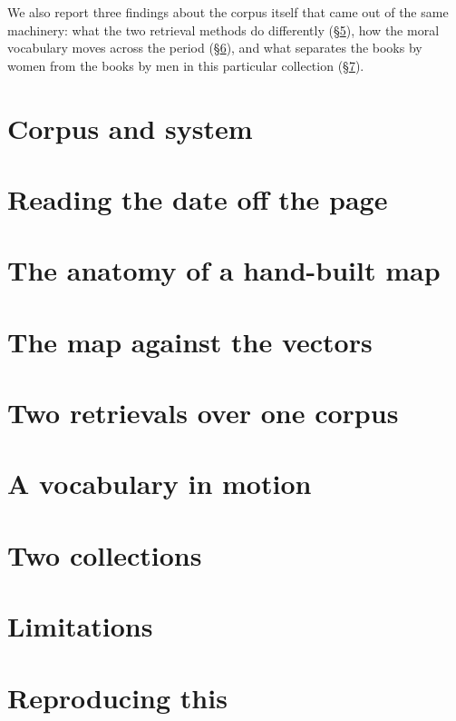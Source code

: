 \documentclass[11pt,a4paper]{article}
\begin{document}
We also report three findings about the corpus itself that came out of the
same machinery: what the two retrieval methods do differently
(\S\ref{sec:retrieval}), how the moral vocabulary moves across the period
(\S\ref{sec:diachrony}), and what separates the books by women from the books
by men in this particular collection (\S\ref{sec:authorship}).

\section{Corpus and system}
\label{sec:corpus}



\section{Reading the date off the page}
\label{sec:dates}



\section{The anatomy of a hand-built map}
\label{sec:graph}



\section{The map against the vectors}
\label{sec:vectors}



\section{Two retrievals over one corpus}
\label{sec:retrieval}



\section{A vocabulary in motion}
\label{sec:diachrony}



\section{Two collections}
\label{sec:authorship}



\section{Limitations}
\label{sec:limits}



\section{Reproducing this}
\label{sec:repro}





\end{document}
